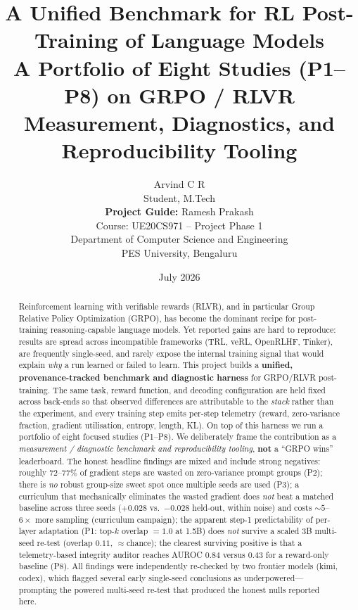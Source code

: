 \documentclass[11pt,a4paper]{article}
\title{\textbf{A Unified Benchmark for RL Post-Training of Language Models}\\[0.3em]
\large A Portfolio of Eight Studies (P1--P8) on GRPO / RLVR\\
\normalsize Measurement, Diagnostics, and Reproducibility Tooling}
\author{
Arvind C R\\
\small Student, M.Tech\\[0.4em]
\textbf{Project Guide:} Ramesh Prakash\\
\small Course: UE20CS971 -- Project Phase 1\\
\small Department of Computer Science and Engineering\\
\small PES University, Bengaluru}
\date{July 2026}
\begin{document}
\maketitle

\begin{abstract}
\noindent
Reinforcement learning with verifiable rewards (RLVR), and in particular Group
Relative Policy Optimization (GRPO), has become the dominant recipe for
post-training reasoning-capable language models. Yet reported gains are hard to
reproduce: results are spread across incompatible frameworks (TRL, veRL,
OpenRLHF, Tinker), are frequently single-seed, and rarely expose the internal
training signal that would explain \emph{why} a run learned or failed to learn.
This project builds a \textbf{unified, provenance-tracked benchmark and diagnostic
harness} for GRPO/RLVR post-training. The same task, reward function, and
decoding configuration are held fixed across back-ends so that observed
differences are attributable to the \emph{stack} rather than the experiment, and
every training step emits per-step telemetry (reward, zero-variance fraction,
gradient utilisation, entropy, length, KL). On top of this harness we run a
portfolio of eight focused studies (P1--P8). We deliberately frame the
contribution as a \emph{measurement / diagnostic benchmark and reproducibility
tooling}, \textbf{not} a ``GRPO wins'' leaderboard. The honest headline findings
are mixed and include strong negatives: roughly $72$--$77\%$ of gradient steps
are wasted on zero-variance prompt groups (P2); there is \emph{no} robust
group-size sweet spot once multiple seeds are used (P3); a curriculum that
mechanically eliminates the wasted gradient does \emph{not} beat a matched
baseline across three seeds ($+0.028$ vs.\ $-0.028$ held-out, within noise) and
costs ${\sim}5$--$6\times$ more sampling (curriculum campaign); the apparent
step-1 predictability of per-layer adaptation (P1: top-$k$ overlap $=1.0$ at 1.5B)
does \emph{not} survive a scaled 3B multi-seed re-test (overlap $0.11$, ${\approx}$chance);
the clearest surviving positive is that a telemetry-based integrity
auditor reaches AUROC $0.84$ versus $0.43$ for a reward-only baseline (P8). All
findings were independently re-checked by two frontier models (kimi, codex),
which flagged several early single-seed conclusions as underpowered---prompting
the powered multi-seed re-test that produced the honest nulls reported here.
\end{abstract}
\end{document}
